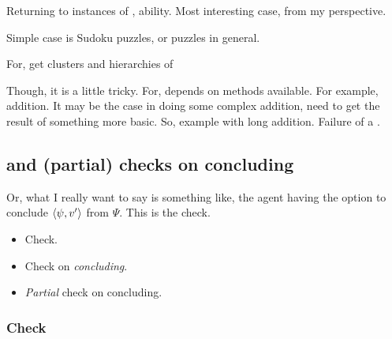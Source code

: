 \begin{note}
  Returning to instances of , ability.
  Most interesting case, from my perspective.

  Simple case is Sudoku puzzles, or puzzles in general.

  For, get clusters and hierarchies of 

  Though, it is a little tricky.
  For, depends on methods available.
  For example, addition.
  It may be the case in doing some complex addition, need to get the result of something more basic.
  So, example with long addition.
  Failure of a \requ{}.
\end{note}

\subsection{ and (partial) checks on concluding}
\label{cha:zS:sec:requs:checks}

\begin{note}
  Or, what I really want to say is something like, the agent having the option to conclude \(\langle \psi, v' \rangle\) from \(\Psi\).
  This is the check.
\end{note}

\begin{note}
  \begin{itemize}
  \item Check.
  \item Check on \emph{concluding}.
  \item \emph{Partial} check on concluding.
  \end{itemize}
\end{note}

\subsubsection{Check}

